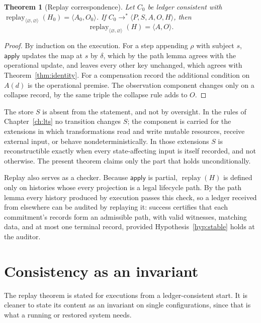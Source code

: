 \documentclass[11pt,openany]{book}
\newtheorem{theorem}{Theorem}[chapter]
\theoremstyle{remark}
\newcommand{\replay}{\operatorname{replay}}
\begin{document}
\begin{theorem}[Replay correspondence]\label{thm:replay}
Let $C_0$ be ledger consistent with
$\replay_{\langle\varnothing,\varnothing\rangle}(H_0)=\langle A_0,O_0\rangle$.
If $C_0\to^{*}\langle P,S,A,O,H\rangle$, then
\[
\replay_{\langle\varnothing,\varnothing\rangle}(H)=\langle A,O\rangle.
\]
\end{theorem}

\begin{proof}
By induction on the execution. For a step appending $\rho$ with subject
$s$, $\mathsf{apply}$ updates the map at $s$ by $\delta$, which by the
path lemma agrees with the operational update, and leaves every other key
unchanged, which agrees with Theorem~\ref{thm:identity}. For a
compensation record the additional condition on $A(d)$ is the operational
premise. The observation component changes only on a collapse record, by
the same triple the collapse rule adds to $O$.
\end{proof}

The store $S$ is absent from the statement, and not by oversight. In the
rules of Chapter~\ref{ch:lts} no transition changes $S$; the component is
carried for the extensions in which transformations read and write mutable
resources, receive external input, or behave nondeterministically. In
those extensions $S$ is reconstructible exactly when every state-affecting
input is itself recorded, and not otherwise. The present theorem claims
only the part that holds unconditionally.

Replay also serves as a checker. Because $\mathsf{apply}$ is partial,
$\replay(H)$ is defined only on histories whose every projection is a legal
lifecycle path. By the path lemma every history produced by execution
passes this check, so a ledger received from elsewhere can be audited by
replaying it: success certifies that each commitment's records form an
admissible path, with valid witnesses, matching data, and at most one
terminal record, provided Hypothesis~\ref{hyp:stable} holds at the auditor.

\section{Consistency as an invariant}

The replay theorem is stated for executions from a ledger-consistent
start. It is cleaner to state its content as an invariant on single
configurations, since that is what a running or restored system needs.
\end{document}
